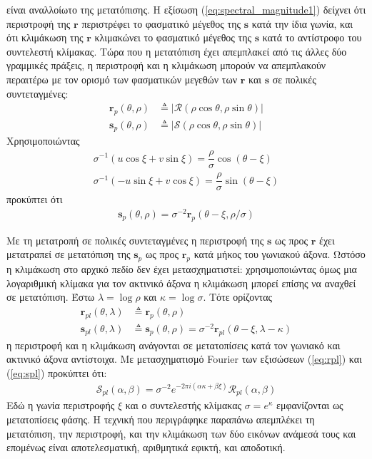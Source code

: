 είναι αναλλοίωτο της μετατόπισης. Η εξίσωση (\ref{eq:spectral_magnitude1})
δείχνει ότι περιστροφή της $\bm{r}$ περιστρέφει το φασματικό μέγεθος της
$\bm{s}$ κατά την ίδια γωνία, και ότι κλιμάκωση της $\bm{r}$ κλιμακώνει το
φασματικό μέγεθος της $\bm{s}$ κατά το αντίστροφο του συντελεστή κλίμακας. Τώρα
που η μετατόπιση έχει απεμπλακεί από τις άλλες δύο γραμμικές πράξεις, η
περιστροφή και η κλιμάκωση μπορούν να απεμπλακούν περαιτέρω με τον ορισμό των
φασματικών μεγεθών των $\bm{r}$ και $\bm{s}$ σε πολικές συντεταγμένες:
\begin{align}
  \bm{r}_p(\theta,\rho) &\triangleq |\mathcal{R} (\rho\cos\theta, \rho\sin\theta)| \nonumber \\
  \bm{s}_p(\theta,\rho) &\triangleq |\mathcal{S} (\rho\cos\theta, \rho\sin\theta)| \nonumber
\end{align}
Χρησιμοποιώντας
\begin{align}
  \sigma^{-1} (u\cos\xi+ v\sin\xi) = \dfrac{\rho}{\sigma} \cos(\theta - \xi) \nonumber \\
  \sigma^{-1} (-u\sin\xi+ v\cos\xi) = \dfrac{\rho}{\sigma} \sin(\theta - \xi) \nonumber
\end{align}
προκύπτει ότι
\begin{align}
  \bm{s}_p(\theta,\rho) = \sigma^{-2} \bm{r}_p (\theta-\xi, \rho/\sigma) \nonumber
\end{align}

Με τη μετατροπή σε πολικές συντεταγμένες η περιστροφή της $\bm{s}$ ως προς
$\bm{r}$ έχει μετατραπεί σε μετατόπιση της $\bm{s}_p$ ως προς
$\bm{r}_p$ κατά μήκος του γωνιακού άξονα. Ωστόσο η κλιμάκωση στο αρχικό πεδίο
δεν έχει μετασχηματιστεί: χρησιμοποιώντας όμως μια λογαριθμική κλίμακα για τον
ακτινικό άξονα η κλιμάκωση μπορεί επίσης να αναχθεί σε μετατόπιση. Έστω
$\lambda = \log\rho$ και $\kappa = \log\sigma$. Τότε ορίζοντας
\begin{align}
  \bm{r}_{pl}(\theta, \lambda) &\triangleq \bm{r}_p(\theta,\rho) \label{eq:rpl} \\
  \bm{s}_{pl}(\theta, \lambda) &\triangleq \bm{s}_p(\theta,\rho) = \sigma^{-2} \bm{r}_{pl} (\theta-\xi, \lambda - \kappa) \label{eq:spl}
\end{align}
η περιστροφή και η κλιμάκωση ανάγονται σε μετατοπίσεις κατά τον γωνιακό και
ακτινικό άξονα αντίστοιχα. Με μετασχηματισμό Fourier των εξισώσεων (\ref{eq:rpl})
και (\ref{eq:spl}) προκύπτει ότι:
\begin{align}
  \mathcal{S}_{pl}(\alpha,\beta) = \sigma^{-2} e^{-2 \pi i(\alpha\kappa + \beta\xi)} \mathcal{R}_{pl}(\alpha,\beta) \nonumber
\end{align}
Εδώ η γωνία περιστροφής $\xi$ και ο συντελεστής κλίμακας $\sigma = e^{\kappa}$
εμφανίζονται ως μετατοπίσεις φάσης. Η τεχνική που περιγράφηκε παραπάνω
απεμπλέκει τη μετατόπιση, την περιστροφή, και την κλιμάκωση των δύο εικόνων
ανάμεσά τους και επομένως είναι αποτελεσματική, αριθμητικά εφικτή, και
αποδοτική.


